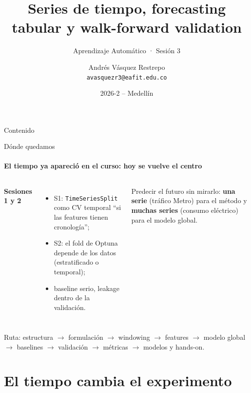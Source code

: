 \documentclass[aspectratio=169,11pt]{beamer}  %
\title[Series de tiempo, forecasting tabular y walk-forward validation]{Series de tiempo, forecasting tabular y walk-forward validation}
\subtitle{Aprendizaje Automático · Sesión 3}
\author[Aprendizaje Automático]{Andrés Vásquez Restrepo\\[2pt]{\normalfont\small\texttt{avasquezr3@eafit.edu.co}}}
\institute{SI7009 - 1 (5553)\\Universidad EAFIT}
\date{2026-2 -- Medellín}
\newcommand{\colhead}[1]{\textbf{#1}\par\vspace{2pt}}
\begin{document}
\titleframe
\setcounter{framenumber}{1}

\begin{frame}[t]{Contenido}
\vspace*{-0.3em}
{\setlength{\parskip}{0pt}\tableofcontents}
\end{frame}

\begin{frame}{Dónde quedamos}
\framesubtitle{El tiempo ya apareció en el curso: hoy se vuelve el centro}
\begin{columns}[T]
\colhead{Sesiones 1 y 2}
\begin{itemize}\small
\item S1: \texttt{TimeSeriesSplit} como CV temporal ``si las features tienen cronología'';
\item S2: el fold de Optuna depende de los datos (estratificado o temporal);
\item baseline serio, leakage dentro de la validación.
\end{itemize}
\begin{keybox}[Hoy]
\small Predecir el futuro sin mirarlo: \textbf{una serie} (tráfico Metro) para el método y \textbf{muchas series} (consumo eléctrico) para el modelo global.
\end{keybox}
\end{columns}
\vspace{4pt}
{\footnotesize\color{mlgray} Ruta: estructura $\rightarrow$ formulación $\rightarrow$ windowing $\rightarrow$ features $\rightarrow$ modelo global $\rightarrow$ baselines $\rightarrow$ validación $\rightarrow$ métricas $\rightarrow$ modelos y hands-on.\par}
\end{frame}

\section{El tiempo cambia el experimento}
\end{document}

